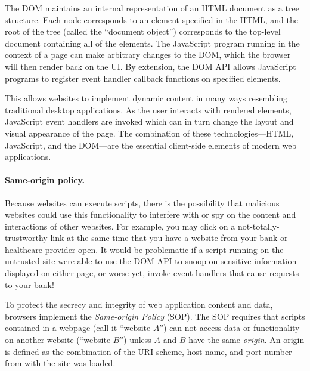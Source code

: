 \documentclass[11pt,twoside]{scrartcl}
\begin{document}
The DOM maintains an internal representation of an HTML document as a tree structure. Each node corresponds to an element specified in the HTML, and the root of the tree (called the ``document object'') corresponds to the top-level document containing all of the elements. The JavaScript program running in the context of a page can make arbitrary changes to the DOM, which the browser will then render back on the UI. By extension, the DOM API allows JavaScript programs to register event handler callback functions on specified elements. 

This allows websites to implement dynamic content in many ways resembling traditional desktop applications. As the user interacts with rendered elements, JavaScript event handlers are invoked which can in turn change the layout and visual appearance of the page. The combination of these technologies---HTML, JavaScript, and the DOM---are the essential client-side elements of modern web applications.

\paragraph{Same-origin policy.}
Because websites can execute scripts, there is the possibility that malicious websites could use this functionality to interfere with or spy on the content and interactions of other websites. For example, you may click on a not-totally-trustworthy link at the same time that you have a website from your bank or healthcare provider open. It would be problematic if a script running on the untrusted site were able to use the DOM API to snoop on sensitive information displayed on either page, or worse yet, invoke event handlers that cause requests to your bank!

To protect the secrecy and integrity of web application content and data, browsers implement the \emph{Same-origin Policy} (SOP). The SOP requires that scripts contained in a webpage (call it ``website $A$'') can not access data or functionality on another website (``website $B$'') unless $A$ and $B$ have the same \emph{origin}. An origin is defined as the combination of the URI scheme, host name, and port number from with the site was loaded. 
\end{document}
